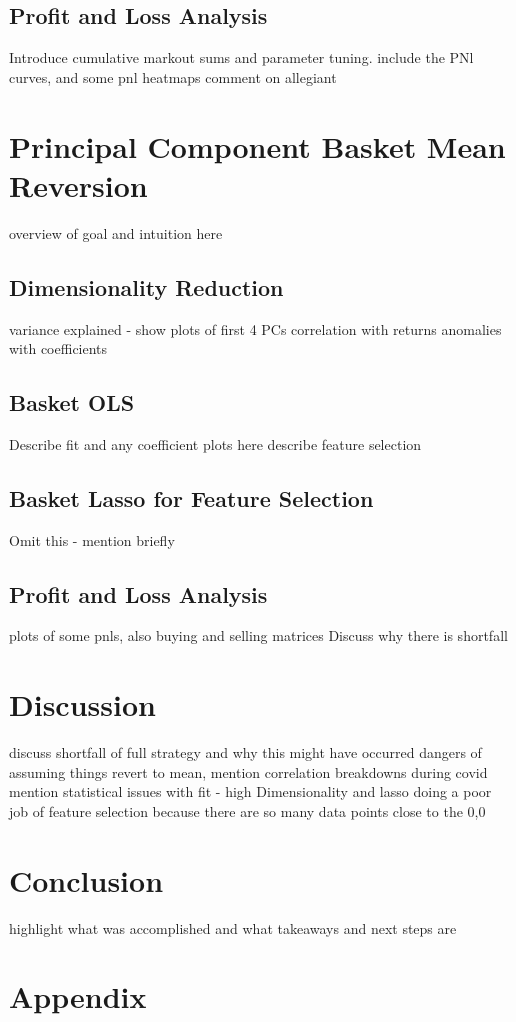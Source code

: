 \documentclass{article}
\begin{document}
\subsection{Profit and Loss Analysis}
Introduce cumulative markout sums and parameter tuning.
include the PNl curves, and some pnl heatmaps
comment on allegiant

\section{Principal Component Basket Mean Reversion}
overview of goal and intuition here
\subsection{Dimensionality Reduction}
variance explained - show plots of first 4 PCs
correlation with returns
anomalies with coefficients
\subsection{Basket OLS}
Describe fit and any coefficient plots here
describe feature selection
\subsection{Basket Lasso for Feature Selection}
Omit this - mention briefly
\subsection{Profit and Loss Analysis}
plots of some pnls, also buying and selling matrices
Discuss why there is shortfall

\section{Discussion}
discuss shortfall of full strategy and why this might have occurred
dangers of assuming things revert to mean, mention correlation breakdowns during
covid
mention statistical issues with fit - high Dimensionality and lasso doing 
a poor job of feature selection because there are so many data points close to the 
0,0

\section{Conclusion}
highlight what was accomplished and what takeaways and next steps are

\newpage
\section{Appendix}
\end{document}
